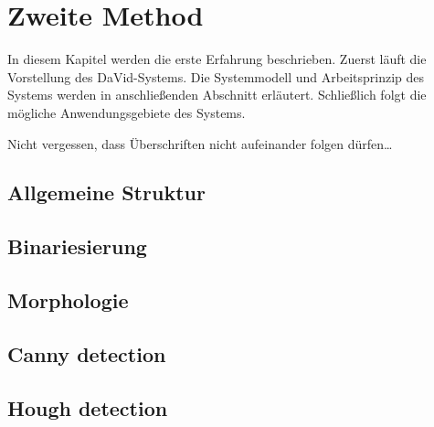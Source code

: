 \chapter{Zweite Method} \label{cha:ZweiteMethod}

In diesem Kapitel werden die erste Erfahrung beschrieben. Zuerst läuft die Vorstellung des DaVid-Systems. Die Systemmodell und Arbeitsprinzip des Systems werden in anschließenden Abschnitt erläutert. Schließlich folgt die mögliche Anwendungsgebiete des Systems.

Nicht vergessen, dass Überschriften nicht aufeinander folgen dürfen\ldots

\section{Allgemeine Struktur}


\section{Binariesierung}



















\section{Morphologie}



\section{Canny detection}



\section{Hough detection}


